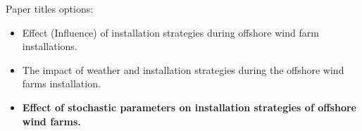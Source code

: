 Paper titles options:
\begin{itemize}
\item Effect (Influence) of installation strategies during offshore wind farm installations.
\item The impact of weather and installation strategies during the offshore wind farms installation.
\item \textbf{Effect of stochastic parameters on installation strategies of offshore wind farms.}
\end{itemize}

